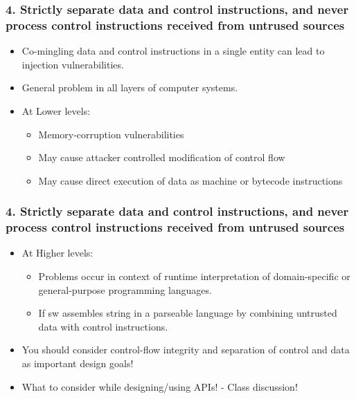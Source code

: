 \documentclass[12pt,norsk]{beamer}
\begin{document}
\begin{frame}

	\frametitle{4. Strictly separate data and control instructions, and never process control instructions received from untrused sources}
	
	\begin{itemize}
	
		\item Co-mingling data and control instructions in a single entity can lead to injection vulnerabilities.
		\item General problem in all layers of computer systems.
		\item At Lower levels:
	
		\begin{itemize}
			\item Memory-corruption vulnerabilities
			\item May cause attacker controlled modification of control flow
			\item May cause direct execution of data as machine or bytecode instructions
		
		\end{itemize}
	
	\end{itemize}

\end{frame}
\begin{frame}
	\frametitle{4. Strictly separate data and control instructions, and never process control instructions received from untrused sources}
	
	\begin{itemize}
	
		\item At Higher levels:
		\begin{itemize}
			\item Problems occur in context of runtime interpretation of domain-specific or general-purpose programming languages.
			\item If sw assembles string in a parseable language by combining untrusted data with control instructions.
		\end{itemize}
	
		\item You should consider control-flow integrity and separation of control and data as important design goals!
		\item What to consider while designing/using APIs! - Class discussion!
		 
	\end{itemize}

\end{frame}
\end{document}
